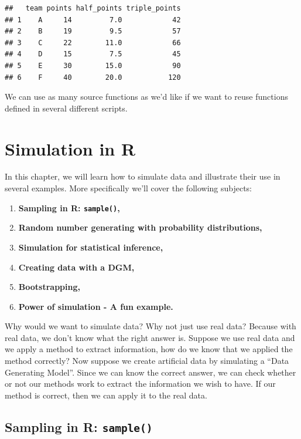 \documentclass[
]{book}
\providecommand{\tightlist}{%
  \setlength{\itemsep}{0pt}\setlength{\parskip}{0pt}}
\begin{document}
\begin{verbatim}
##   team points half_points triple_points
## 1    A     14         7.0            42
## 2    B     19         9.5            57
## 3    C     22        11.0            66
## 4    D     15         7.5            45
## 5    E     30        15.0            90
## 6    F     40        20.0           120
\end{verbatim}

We can use as many source functions as we'd like if we want to reuse functions defined in several different scripts.

\hypertarget{simulation-in-r}{%
\chapter{Simulation in R}\label{simulation-in-r}}

In this chapter, we will learn how to simulate data and illustrate their use in several examples. More specifically we'll cover the following subjects:

\begin{enumerate}
\def\labelenumi{\arabic{enumi}.}
\tightlist
\item
  \textbf{Sampling in R: \texttt{sample()},}
\item
  \textbf{Random number generating with probability distributions,}
\item
  \textbf{Simulation for statistical inference,}
\item
  \textbf{Creating data with a DGM,}
\item
  \textbf{Bootstrapping,}
\item
  \textbf{Power of simulation - A fun example.}
\end{enumerate}

Why would we want to simulate data? Why not just use real data? Because with real data, we don't know what the right answer is. Suppose we use real data and we apply a method to extract information, how do we know that we applied the method correctly? Now suppose we create artificial data by simulating a ``Data Generating Model''. Since we can know the correct answer, we can check whether or not our methods work to extract the information we wish to have. If our method is correct, then we can apply it to the real data.

\hypertarget{sampling-in-r-sample}{%
\section{\texorpdfstring{Sampling in R: \texttt{sample()}}{Sampling in R: sample()}}\label{sampling-in-r-sample}}
\end{document}
